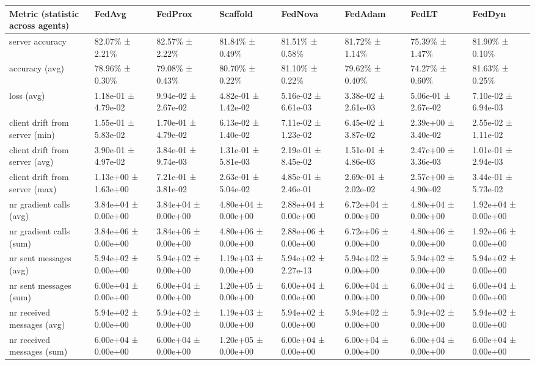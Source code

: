 \begin{tabular}{llllllll}
\hline
 Metric (statistic across agents)   & FedAvg              & FedProx             & Scaffold            & FedNova             & FedAdam             & FedLT               & FedDyn              \\
\hline
 server accuracy                    & 82.07\% ± 2.21\%      & 82.57\% ± 2.22\%      & 81.84\% ± 0.49\%      & 81.51\% ± 0.58\%      & 81.72\% ± 1.14\%      & 75.39\% ± 1.47\%      & 81.90\% ± 0.10\%      \\
 accuracy (avg)                     & 78.96\% ± 0.30\%      & 79.08\% ± 0.43\%      & 80.70\% ± 0.22\%      & 81.10\% ± 0.22\%      & 79.62\% ± 0.40\%      & 74.27\% ± 0.60\%      & 81.63\% ± 0.25\%      \\
 loss (avg)                         & 1.18e-01 ± 4.79e-02 & 9.94e-02 ± 2.67e-02 & 4.82e-01 ± 1.42e-02 & 5.16e-02 ± 6.61e-03 & 3.38e-02 ± 2.61e-03 & 5.06e-01 ± 2.67e-02 & 7.10e-02 ± 6.94e-03 \\
 client drift from server (min)     & 1.55e-01 ± 5.83e-02 & 1.70e-01 ± 4.79e-02 & 6.13e-02 ± 1.40e-02 & 7.11e-02 ± 1.23e-02 & 6.45e-02 ± 3.87e-02 & 2.39e+00 ± 3.40e-02 & 2.55e-02 ± 1.11e-02 \\
 client drift from server (avg)     & 3.90e-01 ± 4.97e-02 & 3.84e-01 ± 9.74e-03 & 1.31e-01 ± 5.81e-03 & 2.19e-01 ± 8.45e-02 & 1.51e-01 ± 4.86e-03 & 2.47e+00 ± 3.36e-03 & 1.01e-01 ± 2.94e-03 \\
 client drift from server (max)     & 1.13e+00 ± 1.63e+00 & 7.21e-01 ± 3.81e-02 & 2.63e-01 ± 5.04e-02 & 4.85e-01 ± 2.46e-01 & 2.69e-01 ± 2.02e-02 & 2.57e+00 ± 4.90e-02 & 3.44e-01 ± 5.73e-02 \\
 nr gradient calls (avg)            & 3.84e+04 ± 0.00e+00 & 3.84e+04 ± 0.00e+00 & 4.80e+04 ± 0.00e+00 & 2.88e+04 ± 0.00e+00 & 6.72e+04 ± 0.00e+00 & 4.80e+04 ± 0.00e+00 & 1.92e+04 ± 0.00e+00 \\
 nr gradient calls (sum)            & 3.84e+06 ± 0.00e+00 & 3.84e+06 ± 0.00e+00 & 4.80e+06 ± 0.00e+00 & 2.88e+06 ± 0.00e+00 & 6.72e+06 ± 0.00e+00 & 4.80e+06 ± 0.00e+00 & 1.92e+06 ± 0.00e+00 \\
 nr sent messages (avg)             & 5.94e+02 ± 0.00e+00 & 5.94e+02 ± 0.00e+00 & 1.19e+03 ± 0.00e+00 & 5.94e+02 ± 2.27e-13 & 5.94e+02 ± 0.00e+00 & 5.94e+02 ± 0.00e+00 & 5.94e+02 ± 0.00e+00 \\
 nr sent messages (sum)             & 6.00e+04 ± 0.00e+00 & 6.00e+04 ± 0.00e+00 & 1.20e+05 ± 0.00e+00 & 6.00e+04 ± 0.00e+00 & 6.00e+04 ± 0.00e+00 & 6.00e+04 ± 0.00e+00 & 6.00e+04 ± 0.00e+00 \\
 nr received messages (avg)         & 5.94e+02 ± 0.00e+00 & 5.94e+02 ± 0.00e+00 & 1.19e+03 ± 0.00e+00 & 5.94e+02 ± 0.00e+00 & 5.94e+02 ± 0.00e+00 & 5.94e+02 ± 0.00e+00 & 5.94e+02 ± 0.00e+00 \\
 nr received messages (sum)         & 6.00e+04 ± 0.00e+00 & 6.00e+04 ± 0.00e+00 & 1.20e+05 ± 0.00e+00 & 6.00e+04 ± 0.00e+00 & 6.00e+04 ± 0.00e+00 & 6.00e+04 ± 0.00e+00 & 6.00e+04 ± 0.00e+00 \\
\hline
\end{tabular}